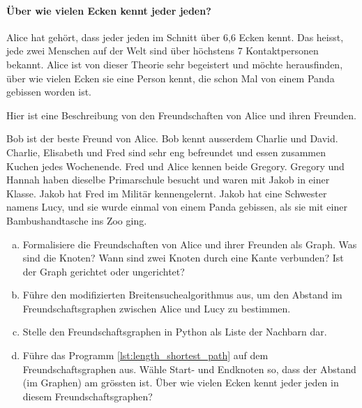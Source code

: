 \paragraph{Über wie vielen Ecken kennt jeder jeden?}
Alice hat gehört, dass jeder jeden im Schnitt über 6,6 Ecken kennt. Das heisst, jede zwei Menschen auf der Welt sind über höchstens 7 Kontaktpersonen bekannt. Alice ist von dieser Theorie sehr begeistert und möchte herausfinden, über wie vielen Ecken sie eine Person kennt, die schon Mal von einem Panda gebissen worden ist.

\begin{aufgabe}\label{aufgabe_panda_gebissen}
Hier ist eine Beschreibung von den Freundschaften von Alice und ihren Freunden.
\begin{displayquote}
Bob ist der beste Freund von Alice. Bob kennt ausserdem Charlie und David. Charlie, Elisabeth und Fred sind sehr eng befreundet und essen zusammen Kuchen jedes Wochenende. Fred und Alice kennen beide Gregory. Gregory und Hannah haben dieselbe Primarschule besucht und waren mit Jakob in einer Klasse. Jakob hat Fred im Militär kennengelernt. Jakob hat eine Schwester namens Lucy, und sie wurde einmal von einem Panda gebissen, als sie mit einer Bambushandtasche ins Zoo ging.
\end{displayquote}

\begin{enumerate}[(a)]
    \item Formalisiere die Freundschaften von Alice und ihrer Freunden als Graph. Was sind die Knoten? Wann sind zwei Knoten durch eine Kante verbunden? Ist der Graph gerichtet oder ungerichtet?
    \item Führe den modifizierten Breitensuchealgorithmus aus, um den Abstand im Freundschaftsgraphen zwischen Alice und Lucy zu bestimmen.
    \item Stelle den Freundschaftsgraphen in Python als Liste der Nachbarn dar.
    \item Führe das Programm \ref{lst:length_shortest_path} auf dem Freundschaftsgraphen aus. Wähle Start- und Endknoten so, dass der Abstand (im Graphen) am grössten ist. Über wie vielen Ecken kennt jeder jeden in diesem Freundschaftsgraphen? 
\end{enumerate}

\end{aufgabe}




